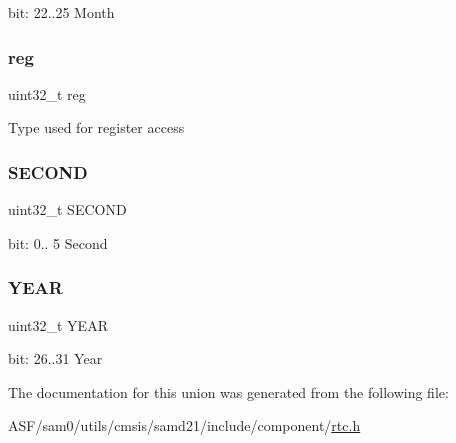 bit\+: 22..25 Month \mbox{\label{union_r_t_c___m_o_d_e2___a_l_a_r_m___type_a6b91636401516a477989a336376d7b40}} 
\subsubsection{\texorpdfstring{reg}{reg}}
{\footnotesize\ttfamily uint32\+\_\+t reg}

Type used for register access \mbox{\label{union_r_t_c___m_o_d_e2___a_l_a_r_m___type_a3c1af5a31c00cc624e89e3f26e47c069}} 
\subsubsection{\texorpdfstring{SECOND}{SECOND}}
{\footnotesize\ttfamily uint32\+\_\+t S\+E\+C\+O\+ND}

bit\+: 0.. 5 Second \mbox{\label{union_r_t_c___m_o_d_e2___a_l_a_r_m___type_ada0131b43bb6b8e77fb3afbe4e25e4d4}} 
\subsubsection{\texorpdfstring{YEAR}{YEAR}}
{\footnotesize\ttfamily uint32\+\_\+t Y\+E\+AR}

bit\+: 26..31 Year 

The documentation for this union was generated from the following file\+:\begin{DoxyCompactItemize}
\item 
A\+S\+F/sam0/utils/cmsis/samd21/include/component/\mbox{\hyperlink{component_2rtc_8h}{rtc.\+h}}\end{DoxyCompactItemize}
